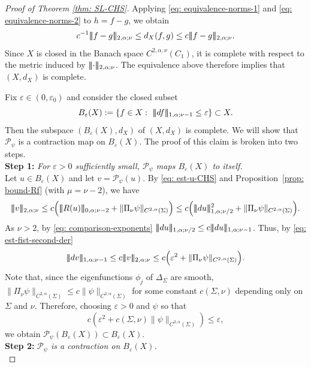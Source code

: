 \documentclass[11pt]{amsart}
\DeclarePairedDelimiter{\tnorm}{\vert\!\vert\!\vert}{\vert\!\vert\!\vert}
\theoremstyle{definition}
\theoremstyle{remark}
\begin{document}
\begin{proof}[Proof of Theorem \ref{thm: SL-CHS}]
Applying \eqref{eq: equivalence-norms-1} and \eqref{eq: equivalence-norms-2} to $h=f-g$, we obtain
\begin{align*}
c^{-1}\tnorm{f-g}_{2,\alpha;\nu}
\leq
d_X(f,g)
\leq
c\tnorm{f-g}_{2,\alpha;\nu}.
\end{align*}
Since $X$ is closed in the Banach space $C^{2,\alpha,\nu}(C_1)$, it is
complete with respect to the metric induced by
$\tnorm{\cdot}_{2,\alpha;\nu}$. The equivalence above therefore implies
that $(X,d_X)$ is complete.

Fix $\varepsilon\in (0,\varepsilon_0)$ and consider the closed subset
\[
B_\varepsilon(X) :=\{f\in X:\ \tnorm{df}_{1,\alpha;\nu-1}\le \varepsilon\} \subset X.
\]
Then the subspace $(B_\varepsilon(X), d_X)$ of $(X, d_X)$ is complete. We will show that $\mathcal{P}_\psi$ is a contraction map on $B_\varepsilon(X)$. The proof of this claim is broken into two steps. \\

\noindent
\textbf{Step 1:} \textit{For $\varepsilon>0$ sufficiently small, $\mathcal P_\psi$ maps $B_\varepsilon(X)$ to itself.} \\

Let $u\in B_\varepsilon(X)$ and let $v=\mathcal P_\psi(u)$.  By \eqref{eq: est-u-CHS} and 
Proposition~\ref{prop: bound-Rf} (with $\mu=\nu-2$), we have
\[
\tnorm{v}_{2,\alpha;\nu}
\le c\Bigl(\tnorm{R(u)}_{0,\alpha;\nu-2}+\|\Pi_\nu \psi\|_{C^{2,\alpha}(\Sigma)}\Bigr)
\le c\Bigl(\tnorm{du}_{1,\alpha;\nu/2}^2+\|\Pi_\nu \psi\|_{C^{2,\alpha}(\Sigma)}\Bigr).
\]
As $\nu > 2$, by \eqref{eq: comparison-exponents} $\tnorm{du}_{1,\alpha;\nu/2}\leq c\tnorm{du}_{1,\alpha;\nu-1}$. Thus, by \eqref{eq: est-fist-second-der} 
\[
\tnorm{dv}_{1,\alpha;\nu-1}\le c\tnorm{v}_{2,\alpha;\nu}
\le c\Bigl(\varepsilon^2+\|\Pi_\nu \psi\|_{C^{2,\alpha}(\Sigma)}\Bigr).
\]
Note that, since the eigenfunctions $\phi_j$ of $\Delta_\Sigma$ are smooth, $\lVert \Pi_\nu\psi\rVert_{C^{2,\alpha}(\Sigma)}\leq c\lVert\psi\rVert_{C^{2,\alpha}(\Sigma)} $ for some constant $c(\Sigma,\nu)$ depending only on $\Sigma$ and $\nu$.
Therefore, choosing $\varepsilon>0$ and $\psi$ so that
\[
c(\varepsilon^2+c(\Sigma,\nu)\|\psi\|_{C^{2,\alpha}(\Sigma)})\le \varepsilon,
\]
we obtain $\mathcal P_\psi(B_\varepsilon(X))\subset B_\varepsilon(X)$. \\

\noindent \textbf{Step 2:} \textit{$\mathcal {P}_\psi$ is a contraction on $B_\varepsilon(X)$.} \\


\end{proof}
\end{document}
